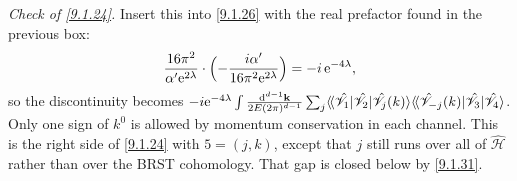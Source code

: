 \begin{tcolorbox}[breakable]
\begin{remark}
		\emph{Check of \eqref{9.1.24}.} Insert this into \eqref{9.1.26} with the real prefactor found in the previous box:
		\begin{equation*}
			\frac{16\pi^2}{\alpha'\mathrm{e}^{2\lambda}}\cdot\Bigl(-\frac{i\alpha'}{16\pi^2\mathrm{e}^{2\lambda}}\Bigr)=-i\,\mathrm{e}^{-4\lambda},
		\end{equation*}
		so the discontinuity becomes $-i\mathrm{e}^{-4\lambda}\int\frac{\mathrm{d}^{d-1}\mathbf k}{2E(2\pi)^{d-1}}\sum_j\langle\!\langle\hat{\mathscr V}_1|\hat{\mathscr V}_2|\hat{\mathscr V}_j(k)\rangle\langle\!\langle\hat{\mathscr V}_{-j}(k)|\hat{\mathscr V}_3|\hat{\mathscr V}_4\rangle$. Only one sign of $k^0$ is allowed by momentum conservation in each channel. This is the right side of \eqref{9.1.24} with $5=(j,k)$, except that $j$ still runs over all of $\hat{\mathscr H}$ rather than over the BRST cohomology. That gap is closed below by \eqref{9.1.31}.
	\end{remark}
\end{tcolorbox}

